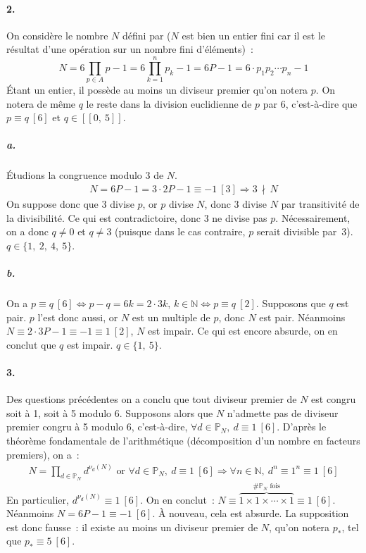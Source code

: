 \documentclass{article}
\begin{document}
  \paragraph{2.} On considère le nombre $N$ défini par ($N$ est bien un entier fini car il est le résultat d'une opération sur un nombre fini d'éléments)~:
  \begin{displaymath}
    N = 6\prod_{p\in A}p - 1 = 6\prod_{k = 1}^{n}p_k - 1 = 6P - 1 = 6 \cdot p_1p_2\cdots p_n - 1
  \end{displaymath}
  Étant un entier, il possède au moins un diviseur premier qu'on notera $p$. On notera de même $q$ le reste dans la division euclidienne de $p$ par 6, c'est-à-dire que $p \equiv q \ [6]$ et $q\in [\![0,\ 5]\!]$.

  \subparagraph{a.} Étudions la congruence modulo 3 de $N$.
  \begin{align*}
    N = 6P - 1 = 3\cdot 2P - 1 \equiv -1 \ [3] \Longrightarrow 3 \,\nmid\, N
  \end{align*}
  On suppose donc que 3 divise $p$, or $p$ divise $N$, donc 3 divise $N$ par transitivité de la divisibilité. Ce qui est contradictoire, donc 3 ne divise pas $p$. Nécessairement, on a donc $q \neq 0$ et $q \neq 3$ (puisque dans le cas contraire, $p$ serait divisible par~3). $q\in\{1,\ 2,\ 4,\ 5\}$.

  \subparagraph{b.} On a $p \equiv q \ [6] \iff p - q = 6k = 2\cdot 3k,\, k\in\mathbb{N} \iff p \equiv q \ [2]$. Supposons que $q$ est pair. $p$ l'est donc aussi, or $N$ est un multiple de $p$, donc $N$ est pair. Néanmoins $N \equiv 2\cdot 3P - 1 \equiv -1 \equiv 1 \ [2]$, $N$ est impair. Ce qui est encore absurde, on en conclut que $q$ est impair. $q\in\{1,\ 5\}$.

  \paragraph{3.} Des questions précédentes on a conclu que tout diviseur premier de $N$ est congru soit à 1, soit à 5 modulo 6. Supposons alors que $N$ n'admette pas de diviseur premier congru à 5 modulo 6, c'est-à-dire, $\forall d\in\mathbb{P}_N,\ d \equiv 1 \ [6]$. D'après le théorème fondamentale de l'arithmétique (décomposition d'un nombre en facteurs premiers), on a~:
  \begin{align*}
    N = \prod_{d\in\mathbb{P}_N} d^{\nu_d(N)} \text{ or } \forall d\in\mathbb{P}_N,\ d \equiv 1 \ [6] \Longrightarrow \forall n\in\mathbb{N},\ d^n \equiv 1^n \equiv 1 \ [6]
  \end{align*}
  En particulier, $d^{\nu_d(N)} \equiv 1 \ [6]$. On en conclut~: $N \equiv \overbrace{1\times 1\times\cdots\times 1}^{\#\mathbb{P}_N \text{ fois}}\equiv 1 \ [6]$. Néanmoins $N = 6P - 1 \equiv -1 \ [6]$. À nouveau, cela est absurde. La supposition est donc fausse~: il existe au moins un diviseur premier de $N$, qu'on notera $p_*$, tel que $p_* \equiv 5 \ [6]$.
\end{document}
